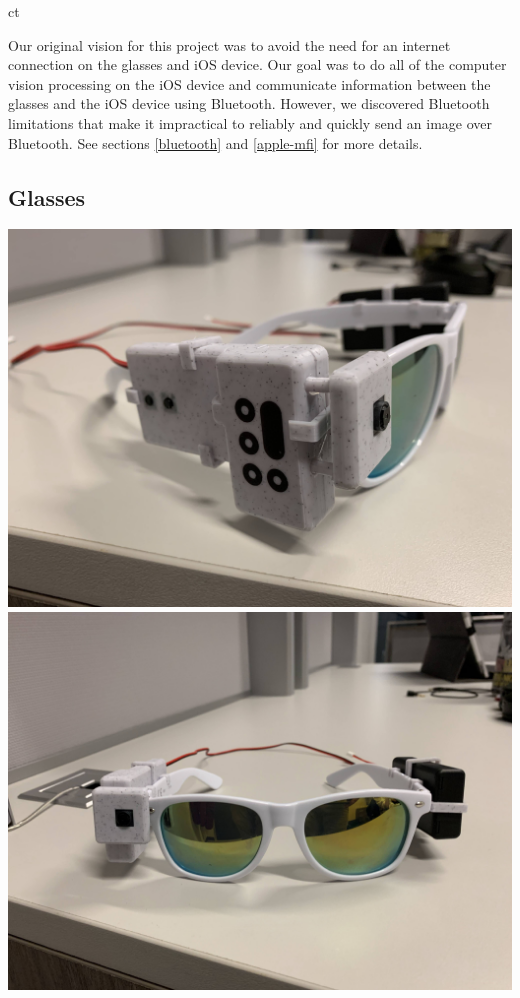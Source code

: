 ct\documentclass[a4paper,11pt]{article}
\begin{document}
Our original vision for this project was to avoid the need for an internet connection on the glasses and iOS device. Our goal was to do all of the computer vision processing on the iOS device and communicate information between the glasses and the iOS device using Bluetooth. However, we discovered Bluetooth limitations that make it impractical to reliably and quickly send an image over Bluetooth. See sections \ref{bluetooth} and \ref{apple-mfi} for more details.

\newpage
\subsection{Glasses}
\begin{center}
    \includegraphics[width={0.3\linewidth}]{img/glasses/left.jpg}
    \includegraphics[width={0.3\linewidth}]{img/glasses/middle.jpg}

\end{center}
\end{document}
